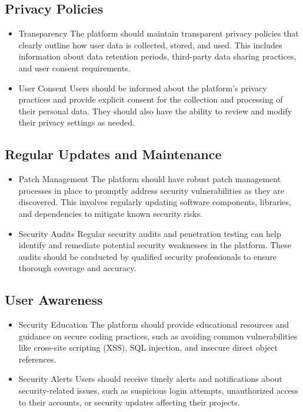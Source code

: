 \subsection{Privacy Policies}

\begin{itemize}
    \item{Transparency}
    The platform should maintain transparent privacy policies that clearly outline how user data is collected, stored, and used. This includes information about data retention periods, third-party data sharing practices, and user consent requirements.
    \item {User Consent}
    Users should be informed about the platform's privacy practices and provide explicit consent for the collection and processing of their personal data. They should also have the ability to review and modify their privacy settings as needed.
\end{itemize}

\subsection{Regular Updates and Maintenance}

\begin{itemize}
    \item {Patch Management}
    The platform should have robust patch management processes in place to promptly address security vulnerabilities as they are discovered. This involves regularly updating software components, libraries, and dependencies to mitigate known security risks.
    \item {Security Audits}
    Regular security audits and penetration testing can help identify and remediate potential security 	weaknesses in the platform. These audits should be conducted by qualified security professionals to ensure thorough coverage and accuracy.
\end{itemize}

\subsection{User Awareness}

\begin{itemize}
    \item {Security Education}
    The platform should provide educational resources and guidance on secure coding practices, such as avoiding common vulnerabilities like cross-site scripting (XSS), SQL injection, and insecure direct object references.
    \item {Security Alerts}
    Users should receive timely alerts and notifications about security-related issues, such as suspicious login attempts, unauthorized access to their accounts, or security updates affecting their projects.
\end{itemize}









